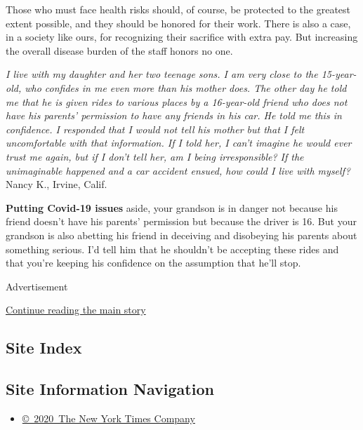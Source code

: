 Those who must face health risks should, of course, be protected to the
greatest extent possible, and they should be honored for their work.
There is also a case, in a society like ours, for recognizing their
sacrifice with extra pay. But increasing the overall disease burden of
the staff honors no one.

\emph{I live with my daughter and her two teenage sons. I am very close
to the 15-year-old, who confides in me even more than his mother does.
The other day he told me that he is given rides to various places by a
16-year-old friend who does not have his parents' permission to have any
friends in his car. He told me this in confidence. I responded that I
would not tell his mother but that I felt uncomfortable with that
information. If I told her, I can't imagine he would ever trust me
again, but if I don't tell her, am I being irresponsible? If the
unimaginable happened and a car accident ensued, how could I live with
myself?} Nancy K., Irvine, Calif.

\textbf{Putting Covid-19 issues} aside, your grandson is in danger not
because his friend doesn't have his parents' permission but because the
driver is 16. But your grandson is also abetting his friend in deceiving
and disobeying his parents about something serious. I'd tell him that he
shouldn't be accepting these rides and that you're keeping his
confidence on the assumption that he'll stop.

Advertisement

\protect\hyperlink{after-bottom}{Continue reading the main story}

\hypertarget{site-index}{%
\subsection{Site Index}\label{site-index}}

\hypertarget{site-information-navigation}{%
\subsection{Site Information
Navigation}\label{site-information-navigation}}

\begin{itemize}
\tightlist
\item
  \href{https://help.nytimes.com/hc/en-us/articles/115014792127-Copyright-notice}{©~2020~The
  New York Times Company}
\end{itemize}

